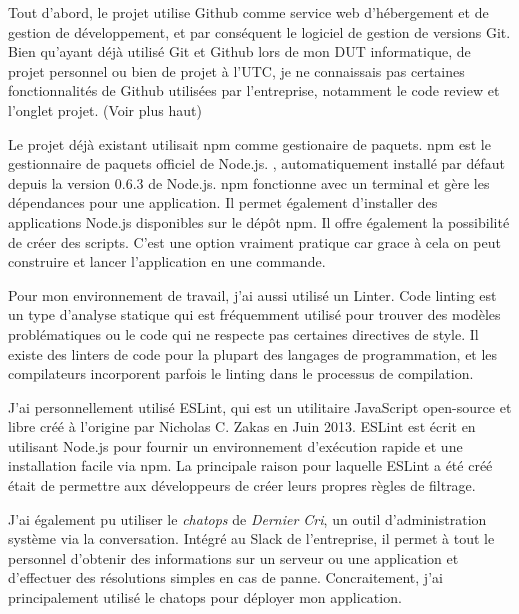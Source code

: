 Tout d'abord, le projet utilise Github comme service web d'hébergement
et de gestion de développement, et par conséquent le logiciel de gestion
de versions Git. Bien qu'ayant déjà utilisé Git et Github lors de mon
DUT informatique, de projet personnel ou bien de projet à l'UTC, je ne
connaissais pas certaines fonctionnalités de Github utilisées par
l'entreprise, notamment le code review et l'onglet projet. (Voir plus
haut)

\bigskip

Le projet déjà existant utilisait npm comme gestionaire de paquets. npm
est le gestionnaire de paquets officiel de Node.js. , automatiquement
installé par défaut depuis la version 0.6.3 de Node.js. npm fonctionne
avec un terminal et gère les dépendances pour une application. Il permet
également d'installer des applications Node.js disponibles sur le dépôt
npm. Il offre également la possibilité de créer des scripts. C'est une
option vraiment pratique car grace à cela on peut construire et lancer
l'application en une commande.

\bigskip

Pour mon environnement de travail, j'ai aussi utilisé un Linter. Code
linting est un type d'analyse statique qui est fréquemment utilisé pour
trouver des modèles problématiques ou le code qui ne respecte pas
certaines directives de style. Il existe des linters de code pour la
plupart des langages de programmation, et les compilateurs incorporent
parfois le linting dans le processus de compilation.

\bigskip

J'ai personnellement utilisé ESLint, qui est un utilitaire JavaScript
open-source et libre créé à l'origine par Nicholas C. Zakas en Juin
2013. ESLint est écrit en utilisant Node.js pour fournir un
environnement d'exécution rapide et une installation facile via npm. La
principale raison pour laquelle ESLint a été créé était de permettre aux
développeurs de créer leurs propres règles de filtrage.

\bigskip

J'ai également pu utiliser le \emph{chatops} de \emph{Dernier Cri}, un
outil d'administration système via la conversation. Intégré au Slack de
l'entreprise, il permet à tout le personnel d'obtenir des informations
sur un serveur ou une application et d'effectuer des résolutions simples
en cas de panne. Concraitement, j'ai principalement utilisé le chatops
pour déployer mon application.

\bigskip


